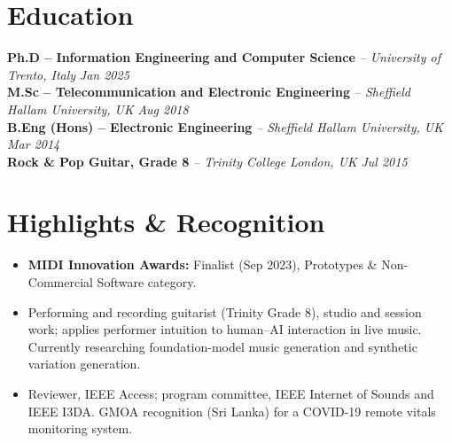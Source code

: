 \documentclass[11pt]{article}
\begin{document}
\section*{Education}
\textbf{Ph.D -- Information Engineering and Computer Science} \textit{\small{ -- University of Trento, Italy}} \hfill \textit{Jan 2025}\\[2pt]
\noindent\textbf{M.Sc -- Telecommunication and Electronic Engineering} \textit{\small{ -- Sheffield Hallam University, UK}} \hfill \textit{Aug 2018}\\[2pt]
\noindent\textbf{B.Eng (Hons) -- Electronic Engineering} \textit{\small{ -- Sheffield Hallam University, UK}} \hfill \textit{Mar 2014}\\[2pt]
\noindent\textbf{Rock \& Pop Guitar, Grade 8} \textit{\small{ -- Trinity College London, UK}} \hfill \textit{Jul 2015}

\vspace{-0.6em}
\section*{Highlights \& Recognition}
\begin{itemize}[leftmargin=1.2em, itemsep=-0.25em]
    \item \textbf{MIDI Innovation Awards:} Finalist (Sep 2023), Prototypes \& Non-Commercial Software category.
    \item Performing and recording guitarist (Trinity Grade 8), studio and session work; applies performer intuition to human--AI interaction in live music. Currently researching foundation-model music generation and synthetic variation generation.
    \item Reviewer, IEEE Access; program committee, IEEE Internet of Sounds and IEEE I3DA. GMOA recognition (Sri Lanka) for a COVID-19 remote vitals monitoring system.
\end{itemize}
\end{document}
